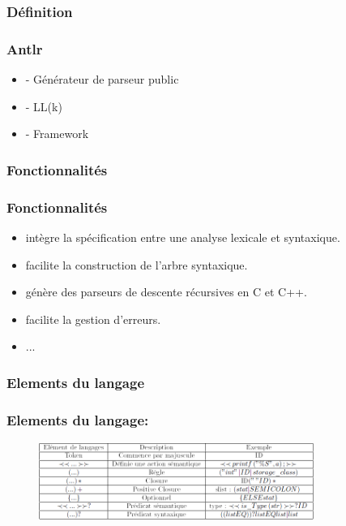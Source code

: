 \documentclass{beamer}
\begin{document}
\subsubsection{Définition}

	\begin{frame}
	\frametitle{Antlr}
 \begin{itemize}
			\item - Générateur de parseur public
			\item - LL(k)
			\item - Framework
			
\end{itemize}
\end{frame} 

\subsubsection{Fonctionnalités}

		\begin{frame}
	\frametitle{Fonctionnalités}
 \begin{itemize}
			\item intègre la spécification entre une analyse lexicale et syntaxique.
			\item facilite la construction de l’arbre syntaxique.
			\item génère des parseurs de descente récursives en C et C++.
			\item facilite la gestion d’erreurs.
			\item ...		
\end{itemize}
\end{frame} 

\subsubsection{Elements du langage}
\begin{frame}
	\frametitle{Elements du langage:}
	
\begin{figure}[h]
	\centering
		\includegraphics[width=0.80\textwidth]{tabantlr.png}
	\label{fig:tabantlr}
\end{figure}
\end{frame} 
\end{document}
